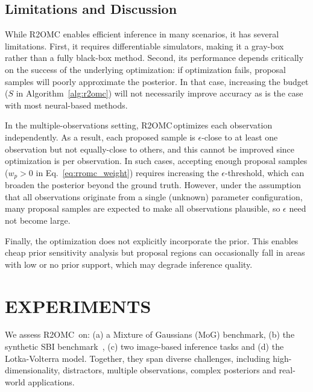 \documentclass[twoside]{article}
\newlength{\secvspace}
\newlength{\subsecvspace}
\newcommand{\rromc}{R2OMC}
\begin{document}
\vspace{\subsecvspace}
\subsection{Limitations and Discussion}
\vspace{\subsecvspace}

While R2OMC enables efficient inference in many scenarios, it has several limitations.
First, it requires differentiable simulators, making it a gray-box rather than a fully black-box method. 
Second, its performance depends critically on the success of the underlying optimization: if optimization fails, proposal samples will poorly approximate the posterior.
In that case, increasing the budget ($S$ in Algorithm~\ref{alg:r2omc}) will not necessarily improve accuracy as is the case with most neural-based methods.

In the multiple-observations setting, \rromc \,optimizes each observation independently. 
As a result, each proposed sample is $\epsilon$-close to at least one observation but not equally-close to others, and this cannot be improved since optimization is per observation. 
In such cases, accepting enough proposal samples ($w_p > 0$ in Eq.~\eqref{eq:rromc_weight}) requires increasing the $\epsilon$-threshold, which can broaden the posterior beyond the ground truth. 
However, under the assumption that all observations originate from a single (unknown) parameter configuration, many proposal samples are expected to make all observations plausible, so $\epsilon$ need not become large.
 

Finally, the optimization does not explicitly incorporate the prior. This enables cheap prior sensitivity analysis but proposal regions can occasionally fall in areas with low or no prior support, which may degrade inference quality.


\vspace{\secvspace}
\section{EXPERIMENTS}
\vspace{\secvspace}
\label{sec:experiments}

We assess \rromc~on: 
(a) a Mixture of Gaussians (MoG) benchmark, 
(b) the synthetic SBI benchmark~\citep{lueckmann2021benchmarking},
(c) two image-based inference tasks and
(d) the Lotka-Volterra model.
Together, they span diverse challenges, including high-dimensionality, distractors, multiple observations, complex posteriors and real-world applications.
\end{document}
